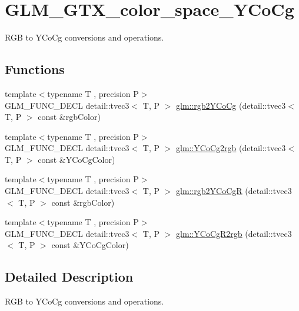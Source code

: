 \hypertarget{group__gtx__color__space___y_co_cg}{}\section{G\+L\+M\+\_\+\+G\+T\+X\+\_\+color\+\_\+space\+\_\+\+Y\+Co\+Cg}
\label{group__gtx__color__space___y_co_cg}


R\+GB to Y\+Co\+Cg conversions and operations.  


\subsection*{Functions}
\begin{DoxyCompactItemize}
\item 
{\footnotesize template$<$typename T , precision P$>$ }\\G\+L\+M\+\_\+\+F\+U\+N\+C\+\_\+\+D\+E\+CL detail\+::tvec3$<$ T, P $>$ \hyperlink{group__gtx__color__space___y_co_cg_ga2a235b86e67866fd9fef640bcc47c93d}{glm\+::rgb2\+Y\+Co\+Cg} (detail\+::tvec3$<$ T, P $>$ const \&rgb\+Color)
\item 
{\footnotesize template$<$typename T , precision P$>$ }\\G\+L\+M\+\_\+\+F\+U\+N\+C\+\_\+\+D\+E\+CL detail\+::tvec3$<$ T, P $>$ \hyperlink{group__gtx__color__space___y_co_cg_gab40e31e352d2d318d3f062df2882c500}{glm\+::\+Y\+Co\+Cg2rgb} (detail\+::tvec3$<$ T, P $>$ const \&Y\+Co\+Cg\+Color)
\item 
{\footnotesize template$<$typename T , precision P$>$ }\\G\+L\+M\+\_\+\+F\+U\+N\+C\+\_\+\+D\+E\+CL detail\+::tvec3$<$ T, P $>$ \hyperlink{group__gtx__color__space___y_co_cg_gaeee43c2a06fe63d46a96cee4d1c63ce6}{glm\+::rgb2\+Y\+Co\+CgR} (detail\+::tvec3$<$ T, P $>$ const \&rgb\+Color)
\item 
{\footnotesize template$<$typename T , precision P$>$ }\\G\+L\+M\+\_\+\+F\+U\+N\+C\+\_\+\+D\+E\+CL detail\+::tvec3$<$ T, P $>$ \hyperlink{group__gtx__color__space___y_co_cg_ga7b90b9b5758dbe96a82a2ef8237a17e9}{glm\+::\+Y\+Co\+Cg\+R2rgb} (detail\+::tvec3$<$ T, P $>$ const \&Y\+Co\+Cg\+Color)
\end{DoxyCompactItemize}


\subsection{Detailed Description}
R\+GB to Y\+Co\+Cg conversions and operations. 

